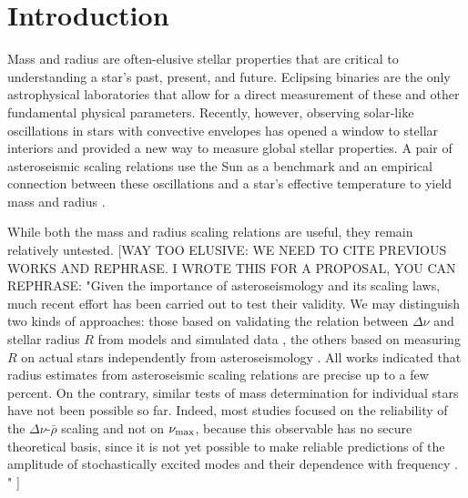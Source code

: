 
\section{Introduction}\label{intro}


Mass and radius are often-elusive stellar properties that are critical to understanding a star's past, present, and future. Eclipsing binaries are the only astrophysical laboratories that allow for a direct measurement of these and other fundamental physical parameters. Recently, however, observing solar-like oscillations in stars with convective envelopes has opened a window to stellar interiors and provided a new way to measure global stellar properties. A pair of asteroseismic scaling relations use the Sun as a benchmark and an empirical connection between these oscillations and a star's effective temperature to yield mass and radius \citep{kje95,hub10,mos13}.

While both the mass and radius scaling relations are useful, they remain relatively untested. [WAY TOO ELUSIVE: WE NEED TO CITE PREVIOUS WORKS AND REPHRASE. I WROTE THIS FOR A PROPOSAL, YOU CAN REPHRASE: "Given the importance of asteroseismology and its scaling laws, much recent effort has been carried out to test their validity. We may distinguish two kinds of approaches: those based on validating the relation between $\Delta\nu$ and stellar radius $R$ from models and simulated data \citep[e.g.][]{Stello_2009b,White_2011,Miglio_2013}, the others based on measuring $R$ on actual stars independently from asteroseismology \citep[e.g.][]{Huber_2011,Huber_2012,Silva_Aguirre_2012}.  All works indicated that radius estimates from asteroseismic scaling relations are precise up to a few percent. On the contrary, similar tests of mass determination for individual stars have not been possible so far. Indeed, most studies focused on the reliability of the $\Delta\nu$-$\bar\rho$ scaling and not on $\nu_{\rm{max}}$, because this observable has no secure theoretical basis, since it is not yet possible to make reliable predictions of the amplitude of stochastically excited modes and their dependence with frequency \citep{Christensen-Dalsgaard_2012}. " ]

